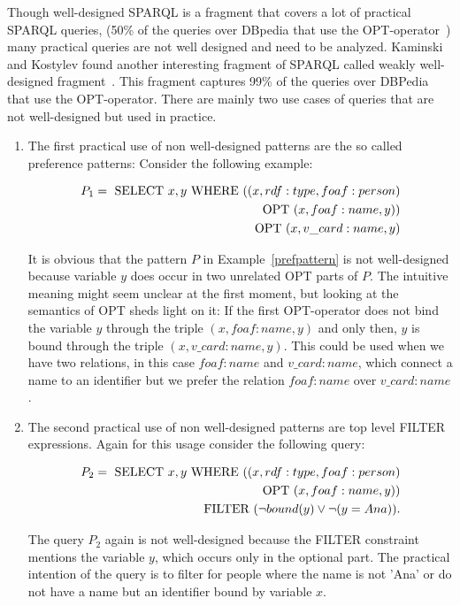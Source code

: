 
Though well-designed SPARQL is a fragment that covers a lot of practical SPARQL
queries, (50\% of the queries over DBpedia that use the
OPT-operator~\cite{Picalausa})
many practical queries are not well designed and need to be analyzed. 
Kaminski and Kostylev found another
interesting fragment of SPARQL called weakly well-designed fragment~\cite{kaminski_bwd}. This
fragment captures 99\% of the queries over DBPedia that use the OPT-operator. 
There are mainly two use cases of queries that are not well-designed but used in
practice.
\begin{enumerate}
	\item The first practical use of non well-designed patterns are the so called
		preference patterns:
		Consider the following example:
		\begin{example}\label{prefpattern}
			\begin{align*}
				P_1 =	\mbox{ SELECT } x, y  \mbox{ WHERE } ((x,rdf:type,foaf:person)\\ \mbox{ OPT } (x,foaf:name,y))\\
				\mbox{ OPT } (x,v\_card:name,y)
			\end{align*}
		\end{example}
		It is obvious that the pattern $P$ in Example~\ref{prefpattern} 
		is not well-designed because variable
		$y$ does occur in two unrelated OPT parts of $P$. The
		intuitive meaning might seem unclear at the first moment, 
		but looking at the semantics of OPT sheds light on it: If the first OPT-operator
		does not bind the variable $y$ through the triple $(x, foaf:name, y)$ 
		and only then, $y$ is bound through the triple $(x, v\_card:name, y)$.
		This could be used when we have two relations, in this case $foaf:name$
		and $v\_card:name$, which connect a name to an identifier but we prefer
		the relation $foaf:name$ over $v\_card:name$.

	\item The second practical use of non well-designed patterns are top level
		FILTER expressions. Again for this usage consider the following query:
		\begin{example}\label{toplevelfilter}
			\begin{align*}
				P_2 = \mbox{ SELECT } x,y \mbox{ WHERE } ((x,rdf:type,foaf:person)\\ \mbox{ OPT } (x,
				foaf:name,y))\\ 
				\mbox{ FILTER }(\neg bound(y) \lor \neg(y = Ana)).
			\end{align*}
		\end{example}
		The query $P_2$ again is not well-designed because the FILTER constraint
		mentions the variable $y$, which occurs only in the optional
		part. The practical intention of the query is to filter for people
		where the name is not 'Ana' or do not have a name but an identifier
		bound by variable $x$.
\end{enumerate}

